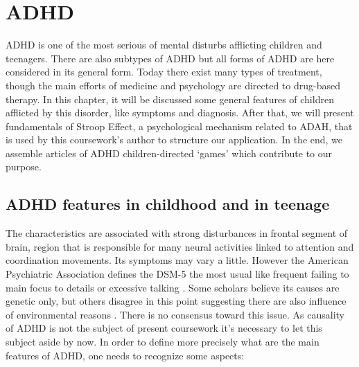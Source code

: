 \chapter{ADHD}
\label{ch:background1}


ADHD is one of the most serious of mental disturbs afflicting children and teenagers. There are also subtypes of ADHD but all forms of ADHD are here considered in its general form. Today there exist many types of treatment, though the main efforts of medicine and psychology are directed to drug-based therapy. In this chapter, it will be discussed some general features of children afflicted by this disorder, like symptoms and diagnosis. After that, we will present fundamentals of Stroop Effect, a psychological mechanism related to ADAH, that is used by this coursework's author to structure our application. In the end, we assemble articles of ADHD children-directed `games' which contribute to our purpose. 

\section{ADHD features in childhood and in teenage}

The characteristics are associated with strong disturbances in frontal segment of brain, region that is responsible for many neural activities linked to attention and coordination movements. Its symptoms may vary a little. However the American Psychiatric Association defines the DSM-5 the most usual like frequent failing to main focus to details or excessive talking \citep{association2013dsm}. Some scholars believe its causes are genetic only, but others disagree in this point suggesting there are also influence of environmental reasons \citep{ADHDDay}. There is no consensus toward this issue. As causality of ADHD is not the subject of present coursework it's necessary to let this subject aside by now. In order to define more precisely what are the main features of ADHD, one needs to recognize some aspects:

